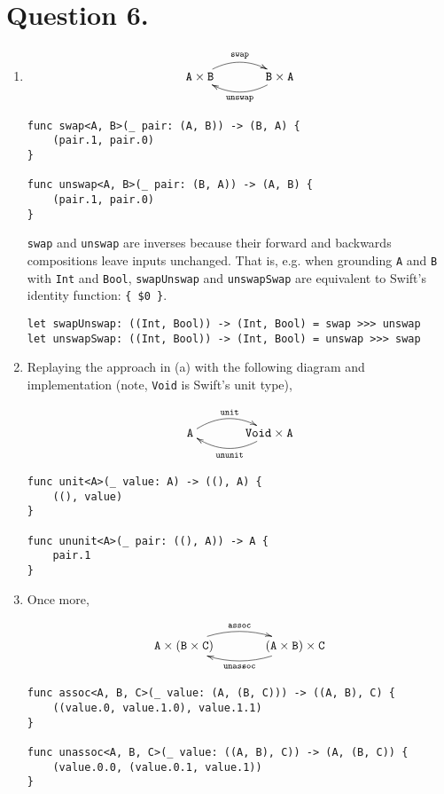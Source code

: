 \documentclass{article}
\begin{document}
\section*{Question 6.}

\begin{enumerate}[label=(\alph*)]

\item \[\xymatrixcolsep{3pc}\xymatrix{\texttt{A} \times \texttt{B} \ar@/^1pc/[r]^{\texttt{swap}} & \texttt{B} \times \texttt{A} \ar@/^1pc/[l]^{\texttt{unswap}}}\]

\begin{verbatim}
func swap<A, B>(_ pair: (A, B)) -> (B, A) {
	(pair.1, pair.0)
}

func unswap<A, B>(_ pair: (B, A)) -> (A, B) {
	(pair.1, pair.0)
}
\end{verbatim}

\texttt{swap} and \texttt{unswap} are inverses because their forward and backwards compositions leave inputs unchanged. That is, e.g. when grounding \texttt{A} and \texttt{B} with \texttt{Int} and \texttt{Bool}, \texttt{swapUnswap} and \texttt{unswapSwap} are equivalent to Swift’s identity function: \texttt{\{ \$0 \}}.

\begin{verbatim}
let swapUnswap: ((Int, Bool)) -> (Int, Bool) = swap >>> unswap
let unswapSwap: ((Int, Bool)) -> (Int, Bool) = unswap >>> swap
\end{verbatim}

\item Replaying the approach in (a) with the following diagram and implementation (note, \texttt{Void} is Swift’s unit type),

\[\xymatrixcolsep{3pc}\xymatrix{\texttt{A} \ar@/^1pc/[r]^{\texttt{unit}} & \texttt{Void} \times \texttt{A} \ar@/^1pc/[l]^{\texttt{ununit}}}\]

\vfill

\begin{verbatim}
func unit<A>(_ value: A) -> ((), A) {
	((), value)
}

func ununit<A>(_ pair: ((), A)) -> A {
	pair.1
}
\end{verbatim}

\item Once more,

\[\xymatrixcolsep{3pc}\xymatrix{\texttt{A} \times (\texttt{B} \times \texttt{C}) \ar@/^1pc/[r]^{\texttt{assoc}} & (\texttt{A} \times \texttt{B}) \times \texttt{C} \ar@/^1pc/[l]^{\texttt{unassoc}}}\]

\begin{verbatim}
func assoc<A, B, C>(_ value: (A, (B, C))) -> ((A, B), C) {
	((value.0, value.1.0), value.1.1)
}

func unassoc<A, B, C>(_ value: ((A, B), C)) -> (A, (B, C)) {
	(value.0.0, (value.0.1, value.1))
}
\end{verbatim}

\end{enumerate}
\end{document}
